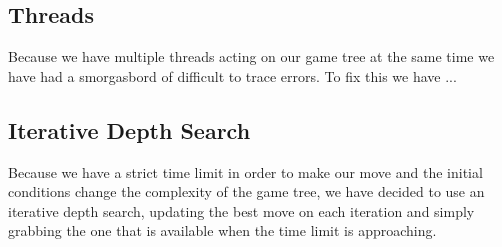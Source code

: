 \documentclass[a4paper, 12pt]{article}
\begin{document}
\begin{figure}[!h]
\centering
{}
\end{figure}
\subsection{Threads}
Because we have multiple threads acting on our game tree at the same time we have had a smorgasbord of difficult to trace errors. To fix this we have ...
\subsection{Iterative Depth Search}
Because we have a strict time limit in order to make our move and the initial conditions change the complexity of the game tree, we have decided to use an iterative depth search, updating the best move on each iteration and simply grabbing the one that is available when the time limit is approaching.
\end{document}
